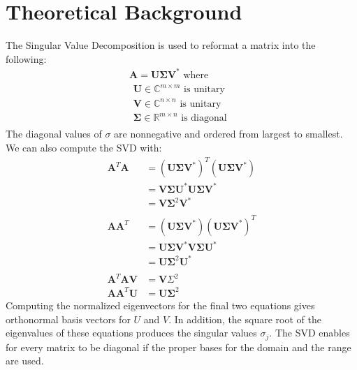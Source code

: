 \documentclass{article}
\begin{document}
\section*{\fontsize{19}{15}\selectfont Theoretical Background}
	The Singular Value Decomposition is used to reformat a matrix into the following: 
	\begin{align*}
\mathbf { A } = \mathbf { U } \boldsymbol { \Sigma } \mathbf { V } ^ { * } \text{ where} \\
\begin{array} { l } { \mathbf { U } \in \mathbb { C } ^ { m \times m } \text { is unitary } } \\ { \mathbf { V } \in \mathbb { C } ^ { n \times n } \text { is unitary } } \\ { \boldsymbol { \Sigma } \in \mathbb { R } ^ { m \times n } \text { is diagonal } } \end{array}
	\end{align*}
	The diagonal values of $\sigma$ are nonnegative and ordered from largest to smallest. We can also compute the SVD with: 
\begin{align*}
\mathbf { A } ^ { T } \mathbf { A } & = \left( \mathbf { U } \boldsymbol { \Sigma } \mathbf { V } ^ { * } \right) ^ { T } \left( \mathbf { U } \boldsymbol { \Sigma } \mathbf { V } ^ { * } \right) \\ & = \mathbf { V } \boldsymbol { \Sigma } \mathbf { U } ^ { * } \mathbf { U } \boldsymbol { \Sigma } \mathbf { V } ^ { * } \\ & = \mathbf { V } \boldsymbol { \Sigma } ^ { 2 } \mathbf { V } ^ { * }  \\ \\
\mathbf { A } \mathbf { A } ^ { T } & = \left( \mathbf { U } \boldsymbol { \Sigma } \mathbf { V } ^ { * } \right) \left( \mathbf { U } \boldsymbol { \Sigma } \mathbf { V } ^ { * } \right) ^ { T } \\ & = \mathbf { U \Sigma V } ^ { * } \mathbf { V } \boldsymbol { \Sigma } \mathbf { U } ^ { * } \\ & = \mathbf { U } \boldsymbol { \Sigma } ^ { 2 } \mathbf { U } ^ { * } \\ \\
\mathbf { A } ^ { T } \mathbf { A V } & = \mathbf { V } \Sigma ^ { 2 } \\ \mathbf { A } \mathbf { A } ^ { T } \mathbf { U } & = \mathbf { U } \boldsymbol { \Sigma } ^ { 2 }
\end{align*}
Computing the normalized eigenvectors for the final two equations gives orthonormal basis vectors for $U$ and $V$. In addition, the square root of the eigenvalues of these equations produces the singular values $\sigma_j$. The SVD enables for every matrix to be diagonal if the proper bases for the domain and the range are used. \\ \\
\end{document}
